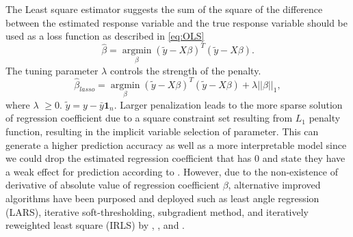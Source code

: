 The Least square estimator suggests the sum of the square of the difference between the estimated response variable and the true response variable should be used as a loss function as described in \autoref{eq:OLS}
\begin{equation}
	\label{eq:OLS}
	\hat{\beta} = \underset{\beta}{\operatorname{argmin}}  (\tilde{y} - X\beta)^T(\tilde{y}-X\beta).
\end{equation}
The tuning parameter $\lambda$ controls the strength of the penalty.
\begin{equation}
	\label{eq:lasso1}
	\hat{\beta}_{lasso} = \underset{\beta}{\operatorname{argmin}} (\tilde{y}-X\beta)^T(\tilde{y}-X\beta) + \lambda ||\beta||_1,
\end{equation}
where $\lambda$ $\geq 0$. $\tilde{y} =  y - \bar{y}\textbf{1}_n$. Larger penalization leads to the more sparse solution of regression coefficient due to a square constraint set resulting from $L_1$ penalty function, resulting in the implicit variable selection of parameter. This can generate a higher prediction accuracy as well as a more interpretable model since we could drop the estimated regression coefficient that has 0 and state they have a weak effect for prediction according to \cite{tibshirani_1996}.
However, due to the non-existence of derivative of absolute value of regression coefficient $\beta$, alternative improved algorithms have been purposed and deployed such as least angle regression (LARS), iterative soft-thresholding, subgradient method, and iteratively reweighted least square (IRLS) by \cite{efron_hastie_johnstone_tibshirani_2004},   \cite{beck_teboulle_2009}, \cite{nan_zhang_shuqing_zeng_2005} and \cite{friedman_hastie_tibshirani_2010}.

